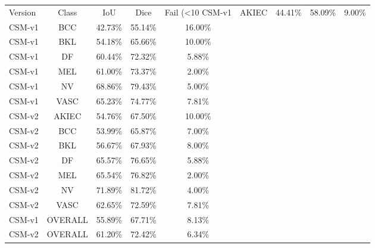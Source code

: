 \begin{tabular}{lcccc}
\toprule
Version & Class & IoU & Dice & Fail (<10%
\midrule
CSM-v1 & AKIEC & 44.41\% & 58.09\% & 9.00\% \\
CSM-v1 & BCC & 42.73\% & 55.14\% & 16.00\% \\
CSM-v1 & BKL & 54.18\% & 65.66\% & 10.00\% \\
CSM-v1 & DF & 60.44\% & 72.32\% & 5.88\% \\
CSM-v1 & MEL & 61.00\% & 73.37\% & 2.00\% \\
CSM-v1 & NV & 68.86\% & 79.43\% & 5.00\% \\
CSM-v1 & VASC & 65.23\% & 74.77\% & 7.81\% \\
CSM-v2 & AKIEC & 54.76\% & 67.50\% & 10.00\% \\
CSM-v2 & BCC & 53.99\% & 65.87\% & 7.00\% \\
CSM-v2 & BKL & 56.67\% & 67.93\% & 8.00\% \\
CSM-v2 & DF & 65.57\% & 76.65\% & 5.88\% \\
CSM-v2 & MEL & 65.54\% & 76.82\% & 2.00\% \\
CSM-v2 & NV & 71.89\% & 81.72\% & 4.00\% \\
CSM-v2 & VASC & 62.65\% & 72.59\% & 7.81\% \\
CSM-v1 & OVERALL & 55.89\% & 67.71\% & 8.13\% \\
CSM-v2 & OVERALL & 61.20\% & 72.42\% & 6.34\% \\
\bottomrule
\end{tabular}
